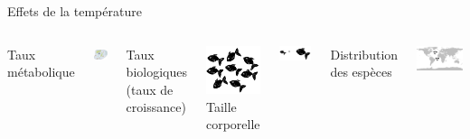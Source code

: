 \documentclass[11pt, compress, aspectratio=1610]{beamer}
\newcommand{\begincols}{\begin{columns}}
\newcommand{\stopcols}{\end{columns}}
\begin{document}
\begin{frame}{Effets de la température}

\begincols
  \centering
 Taux métabolique \par
 \includegraphics[width=0.4\linewidth]{figuresAz/cell.png}\par
 \vspace{1cm} \pause
 Taux biologiques (taux de croissance) \par
 \includegraphics[width=0.5\linewidth]{figuresAz/fish_pop.pdf} \pause
 \hfill{} \centering
 Taille corporelle \par
 \includegraphics[width=0.6\linewidth]{figuresAz/size.pdf}\par
 \vspace{1cm} \pause
 Distribution des espèces \par
 \includegraphics[width=0.8\linewidth]{figuresAz/world.pdf} \par

\stopcols

\end{frame}
\end{document}
